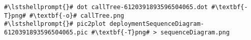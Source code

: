\begin{lstlisting}[caption=Commands to convert the diagrams,label=lst:traceAnalysis:convertDiagrams]
#\lstshellprompt{}# dot callTree-6120391893596504065.dot #\textbf{-T}png# #\textbf{-o}# callTree.png
#\lstshellprompt{}# pic2plot deploymentSequenceDiagram-6120391893596504065.pic #\textbf{-T}png# > sequenceDiagram.png			 
\end{lstlisting}